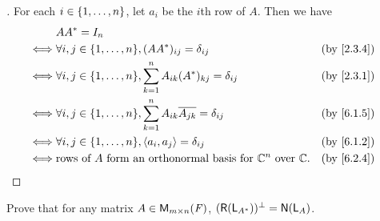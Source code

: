 \begin{proof}[]
  For each \(i \in \left\lbrace1, \dots, n\right\rbrace\), let \(a_i\) be the \(i\)th row of \(A\).
  Then we have
  \begin{align*}
         & AA^* = I_n                                                                                               \\
    \iff & \forall i, j \in \set{1, \dots, n}, (AA^*)_{i j} = \delta_{i j}                          &  & \by{2.3.4} \\
    \iff & \forall i, j \in \set{1, \dots, n}, \sum_{k = 1}^n A_{i k} (A^*)_{k j} = \delta_{i j}    &  & \by{2.3.1} \\
    \iff & \forall i, j \in \set{1, \dots, n}, \sum_{k = 1}^n A_{i k} \conj{A_{j k}} = \delta_{i j} &  & \by{6.1.5} \\
    \iff & \forall i, j \in \set{1, \dots, n}, \inn{a_i, a_j} = \delta_{i j}                        &  & \by{6.1.2} \\
    \iff & \text{rows of } A \text{ form an orthonormal basis for } \C^n \text{ over } \C.          &  & \by{6.2.4}
  \end{align*}
\end{proof}

\begin{ex}\label{ex:6.2.12}
  Prove that for any matrix \(A \in \ms\), \((\rg{\L_{A^*}})^{\perp} = \ns{\L_A}\).
\end{ex}

